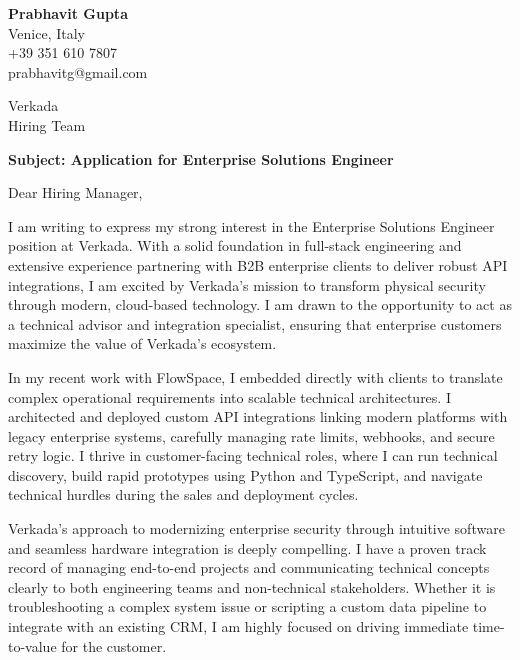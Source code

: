\documentclass[11pt,a4paper]{article}
\begin{document}
\begin{flushleft}
\textbf{Prabhavit Gupta}\\
Venice, Italy\\
+39 351 610 7807\\
prabhavitg@gmail.com
\end{flushleft}

\vspace{2em}

\begin{flushright}
Verkada\\
Hiring Team
\end{flushright}

\vspace{2em}

\textbf{Subject: Application for Enterprise Solutions Engineer}

\vspace{1em}

Dear Hiring Manager,

I am writing to express my strong interest in the Enterprise Solutions Engineer position at Verkada. With a solid foundation in full-stack engineering and extensive experience partnering with B2B enterprise clients to deliver robust API integrations, I am excited by Verkada's mission to transform physical security through modern, cloud-based technology. I am drawn to the opportunity to act as a technical advisor and integration specialist, ensuring that enterprise customers maximize the value of Verkada's ecosystem.

In my recent work with FlowSpace, I embedded directly with clients to translate complex operational requirements into scalable technical architectures. I architected and deployed custom API integrations linking modern platforms with legacy enterprise systems, carefully managing rate limits, webhooks, and secure retry logic. I thrive in customer-facing technical roles, where I can run technical discovery, build rapid prototypes using Python and TypeScript, and navigate technical hurdles during the sales and deployment cycles. 

Verkada’s approach to modernizing enterprise security through intuitive software and seamless hardware integration is deeply compelling. I have a proven track record of managing end-to-end projects and communicating technical concepts clearly to both engineering teams and non-technical stakeholders. Whether it is troubleshooting a complex system issue or scripting a custom data pipeline to integrate with an existing CRM, I am highly focused on driving immediate time-to-value for the customer.
\end{document}
